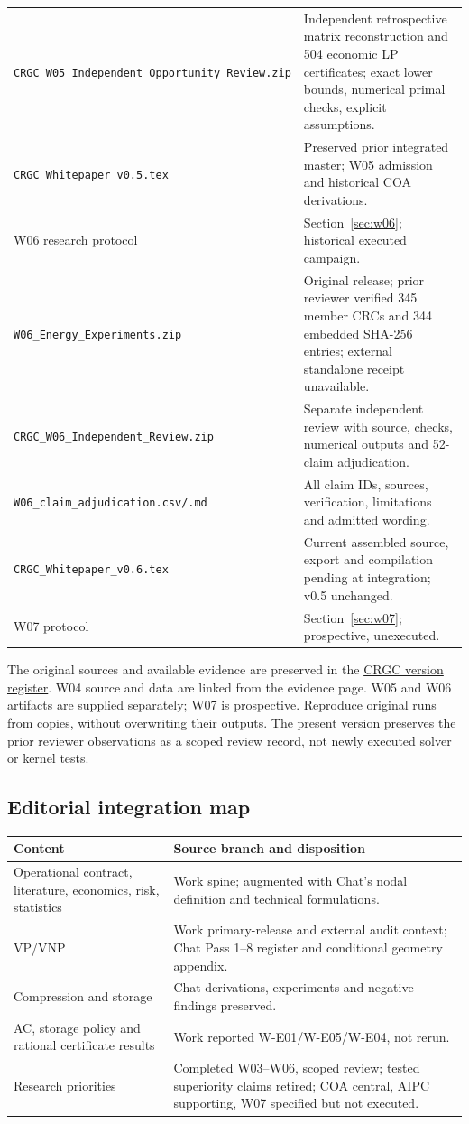 \documentclass[11pt,letterpaper]{article}
\begin{document}
\begin{longtable}{P{.42\linewidth}P{.49\linewidth}}
\texttt{CRGC\_W05\_Independent\_}\newline\texttt{Opportunity\_Review.zip} & Independent retrospective matrix reconstruction and 504 economic LP certificates; exact lower bounds, numerical primal checks, explicit assumptions.\\
\texttt{CRGC\_Whitepaper\_v0.5.tex} & Preserved prior integrated master; W05 admission and historical COA derivations.\\
W06 research protocol & Section~\ref{sec:w06}; historical executed campaign.\\
\texttt{W06\_Energy\_Experiments.zip} & Original release; prior reviewer verified 345 member CRCs and 344 embedded SHA-256 entries; external standalone receipt unavailable.\\
\texttt{CRGC\_W06\_Independent\_Review.zip} & Separate independent review with source, checks, numerical outputs and 52-claim adjudication.\\
\texttt{W06\_claim\_adjudication.csv/.md} & All claim IDs, sources, verification, limitations and admitted wording.\\
\texttt{CRGC\_Whitepaper\_v0.6.tex} & Current assembled source, export and compilation pending at integration; v0.5 unchanged.\\
W07 protocol & Section~\ref{sec:w07}; prospective, unexecuted.\\
\bottomrule
\end{longtable}
The original sources and available evidence are preserved in the \href{https://chatgpt.com/space/page_c22eca223fc88191a109ba88e518d954}{CRGC version register}. W04 source and data are linked from the evidence page. W05 and W06 artifacts are supplied separately; W07 is prospective. Reproduce original runs from copies, without overwriting their outputs. The present version preserves the prior reviewer observations as a scoped review record, not newly executed solver or kernel tests.

\subsection{Editorial integration map}
\begin{longtable}{P{.38\linewidth}P{.53\linewidth}}
\toprule Content & Source branch and disposition\\\midrule\endhead
Operational contract, literature, economics, risk, statistics & Work spine; augmented with Chat's nodal definition and technical formulations.\\
VP/VNP & Work primary-release and external audit context; Chat Pass 1--8 register and conditional geometry appendix.\\
Compression and storage & Chat derivations, experiments and negative findings preserved.\\
AC, storage policy and rational certificate results & Work reported W-E01/W-E05/W-E04, not rerun.\\
Research priorities & Completed W03--W06, scoped review; tested superiority claims retired; COA central, AIPC supporting, W07 specified but not executed.\\
\bottomrule
\end{longtable}
\end{document}
